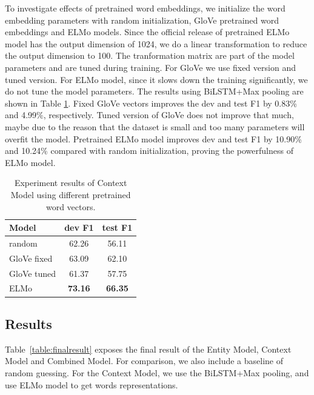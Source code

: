 \documentclass[letterpaper]{article}
\begin{document}
To investigate effects of pretrained word embeddings, we initialize the word embedding parameters with random initialization, GloVe pretrained word embeddings and ELMo models. Since the official release of pretrained ELMo model has the output dimension of 1024, we do a linear transformation to reduce the output dimension to 100. The tranformation matrix are part of the model parameters and are tuned during training. For GloVe we use fixed version and tuned version. For ELMo model, since it slows down the training significantly, we do not tune the model parameters. The results using BiLSTM+Max pooling are shown in Table \ref{table:pretrain}. Fixed GloVe vectors improves the dev and test F1 by 0.83\% and 4.99\%, respectively. Tuned version of GloVe does not improve that much, maybe due to the reason that the dataset is small and too many parameters will overfit the model. Pretrained ELMo model improves dev and test F1 by 10.90\% and 10.24\% compared with random initialization, proving the powerfulness of ELMo model.

\begin{table}[t]
\centering
\begin{tabular}{l c c} 
\hline
{\bf Model}  & {\bf dev F1 } & {\bf test F1 } \\
\hline\hline
random  &  62.26  & 56.11 \\ 
GloVe fixed  & 63.09  & 62.10 \\
GloVe tuned  & 61.37  & 57.75  \\
ELMo  & {\bf 73.16} & {\bf 66.35} \\
\hline
\end{tabular}
\caption{Experiment results of Context Model using different pretrained word vectors.}
\label{table:pretrain}
\end{table}

\subsection{Results}

Table~\ref{table:finalresult} exposes the final result of the Entity Model, Context Model and Combined Model. For comparison, we also include a baseline of random guessing. For the Context Model, we use the BiLSTM+Max pooling, and use ELMo model to get words representations.
\end{document}
